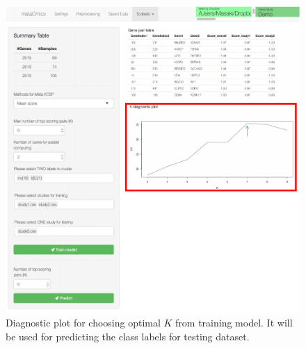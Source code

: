 \begin{figure}[H]
\begin{center}
\includegraphics[scale=0.7]{./figure/MetaKTSP/Figure10.pdf}
\caption{Diagnostic plot for choosing optimal $K$ from training model. It will be used for predicting the class labels for testing dataset.}
\label{fig:DiagnosticPlot}
\end{center}
\end{figure}



